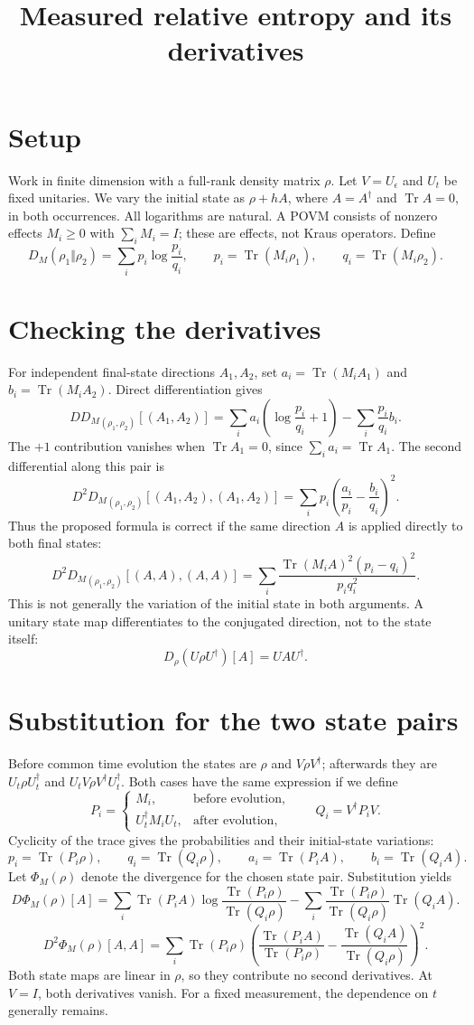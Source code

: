 \documentclass[11pt,a4paper]{article}
\title{Measured relative entropy and its derivatives}
\author{}
\date{}
\newcommand{\Tr}{\operatorname{Tr}}
\begin{document}
\maketitle

\section{Setup}
Work in finite dimension with a full-rank density matrix $\rho$. Let $V=U_\epsilon$ and $U_t$ be fixed unitaries. We vary the initial state as $\rho+hA$, where $A=A^\dagger$ and $\Tr A=0$, in both occurrences. All logarithms are natural. A POVM consists of nonzero effects $M_i\geq0$ with $\sum_iM_i=I$; these are effects, not Kraus operators. Define
\[D_M(\rho_1\Vert\rho_2)=\sum_i p_i\log\frac{p_i}{q_i},\qquad p_i=\Tr(M_i\rho_1),\qquad q_i=\Tr(M_i\rho_2).\]

\section{Checking the derivatives}
For independent final-state directions $A_1,A_2$, set $a_i=\Tr(M_iA_1)$ and $b_i=\Tr(M_iA_2)$. Direct differentiation gives
\[DD_M{}_{(\rho_1,\rho_2)}[(A_1,A_2)]=\sum_i a_i\left(\log\frac{p_i}{q_i}+1\right)-\sum_i\frac{p_i}{q_i}b_i.\]
The $+1$ contribution vanishes when $\Tr A_1=0$, since $\sum_i a_i=\Tr A_1$. The second differential along this pair is
\[D^2D_M{}_{(\rho_1,\rho_2)}[(A_1,A_2),(A_1,A_2)]=\sum_i p_i\left(\frac{a_i}{p_i}-\frac{b_i}{q_i}\right)^2.\]
Thus the proposed formula is correct if the same direction $A$ is applied directly to both final states:
\[D^2D_M{}_{(\rho_1,\rho_2)}[(A,A),(A,A)]=\sum_i\frac{\Tr(M_iA)^2(p_i-q_i)^2}{p_iq_i^2}.\]
This is not generally the variation of the initial state in both arguments. A unitary state map differentiates to the conjugated direction, not to the state itself:
\[D_\rho(U\rho U^\dagger)[A]=UAU^\dagger.\]

\section{Substitution for the two state pairs}
Before common time evolution the states are $\rho$ and $V\rho V^\dagger$; afterwards they are $U_t\rho U_t^\dagger$ and $U_tV\rho V^\dagger U_t^\dagger$. Both cases have the same expression if we define
\[P_i=\begin{cases}M_i,&\text{before evolution},\\U_t^\dagger M_iU_t,&\text{after evolution},\end{cases}\qquad Q_i=V^\dagger P_iV.\]
Cyclicity of the trace gives the probabilities and their initial-state variations:
\[p_i=\Tr(P_i\rho),\qquad q_i=\Tr(Q_i\rho),\qquad a_i=\Tr(P_iA),\qquad b_i=\Tr(Q_iA).\]
Let $\Phi_M(\rho)$ denote the divergence for the chosen state pair. Substitution yields
\[D\Phi_M(\rho)[A]=\sum_i\Tr(P_iA)\log\frac{\Tr(P_i\rho)}{\Tr(Q_i\rho)}-\sum_i\frac{\Tr(P_i\rho)}{\Tr(Q_i\rho)}\Tr(Q_iA).\]
\[D^2\Phi_M(\rho)[A,A]=\sum_i\Tr(P_i\rho)\left(\frac{\Tr(P_iA)}{\Tr(P_i\rho)}-\frac{\Tr(Q_iA)}{\Tr(Q_i\rho)}\right)^2.\]
Both state maps are linear in $\rho$, so they contribute no second derivatives. At $V=I$, both derivatives vanish. For a fixed measurement, the dependence on $t$ generally remains.
\end{document}
